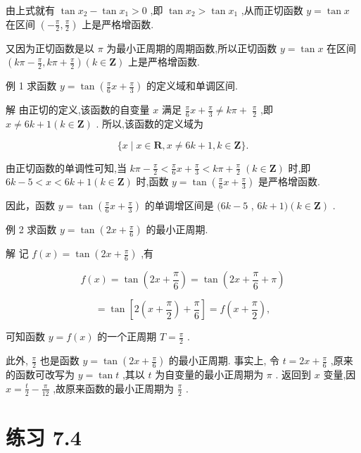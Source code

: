 \documentclass[10pt]{article}
\begin{document}
由上式就有 \(\tan {x}_{2} - \tan {x}_{1} > 0\) ,即 \(\tan {x}_{2} > \tan {x}_{1}\) ,从而正切函数 \(y = \tan x\) 在区间 \(\left( {-\frac{\pi }{2},\frac{\pi }{2}}\right)\) 上是严格增函数.

又因为正切函数是以 \(\pi\) 为最小正周期的周期函数,所以正切函数 \(y = \tan x\) 在区间 \(\left( {{k\pi } - \frac{\pi }{2},{k\pi } + \frac{\pi }{2}}\right) \left( {k \in  \mathbf{Z}}\right)\) 上是严格增函数.

例 1 求函数 \(y = \tan \left( {\frac{\pi }{6}x + \frac{\pi }{3}}\right)\) 的定义域和单调区间.

解 由正切的定义,该函数的自变量 \(x\) 满足 \(\frac{\pi }{6}x + \frac{\pi }{3} \neq  {k\pi } + \; \frac{\pi }{2}\) ,即 \(x \neq  {6k} + 1\left( {k \in  \mathbf{Z}}\right)\) . 所以,该函数的定义域为

\[
\{ x \mid  x \in  \mathbf{R},x \neq  {6k} + 1,k \in  \mathbf{Z}\} .
\]

由正切函数的单调性可知,当 \({k\pi } - \frac{\pi }{2} < \frac{\pi }{6}x + \frac{\pi }{3} < {k\pi } + \frac{\pi }{2} \; \left( {k \in  \mathbf{Z}}\right)\) 时,即 \({6k} - 5 < x < {6k} + 1\left( {k \in  \mathbf{Z}}\right)\) 时,函数 \(y = \tan \left( {\frac{\pi }{6}x + \frac{\pi }{3}}\right)\) 是严格增函数.

因此，函数 \(y = \tan \left( {\frac{\pi }{6}x + \frac{\pi }{3}}\right)\) 的单调增区间是 \(({6k} - 5\) , \({6k} + 1)\left( {k \in  \mathbf{Z}}\right)\) .

例 2 求函数 \(y = \tan \left( {{2x} + \frac{\pi }{6}}\right)\) 的最小正周期.

解 记 \(f\left( x\right)  = \tan \left( {{2x} + \frac{\pi }{6}}\right)\) ,有

\[
f\left( x\right)  = \tan \left( {{2x} + \frac{\pi }{6}}\right)  = \tan \left( {{2x} + \frac{\pi }{6} + \pi }\right)
\]

\[
= \tan \left\lbrack  {2\left( {x + \frac{\pi }{2}}\right)  + \frac{\pi }{6}}\right\rbrack   = f\left( {x + \frac{\pi }{2}}\right) ,
\]

可知函数 \(y = f\left( x\right)\) 的一个正周期 \(T = \frac{\pi }{2}\) .

此外, \(\frac{\pi }{2}\) 也是函数 \(y = \tan \left( {{2x} + \frac{\pi }{6}}\right)\) 的最小正周期. 事实上, 令 \(t = {2x} + \frac{\pi }{6}\) ,原来的函数可改写为 \(y = \tan t\) ,其以 \(t\) 为自变量的最小正周期为 \(\pi\) . 返回到 \(x\) 变量,因 \(x = \frac{t}{2} - \frac{\pi }{12}\) ,故原来函数的最小正周期为 \(\frac{\pi }{2}\) .

\section*{练习 7.4}
\end{document}
